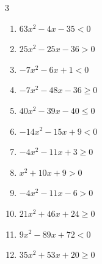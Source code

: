 \begin{multicols}{3}
\begin{enumerate}
  \item $63x^{2}-4x-35<0$


  \item $25x^{2}-25x-36>0$


  \item $-7x^{2}-6x+1<0$


  \item $-7x^{2}-48x-36\geq 0$


  \item $40x^{2}-39x-40\leq 0$


  \item $-14x^{2}-15x+9<0$


  \item $-4x^{2}-11x+3\geq 0$


  \item $x^{2}+10x+9>0$

        \phantom{$\displaystyle x < -9 , \; -1 < x$}

  \item $-4x^{2}-11x-6>0$


  \item $21x^{2}+46x+24\geq 0$


\columnbreak %

  \item $9x^{2}-89x+72<0$


  \item $35x^{2}+53x+20\geq 0$



\end{enumerate}
\end{multicols}

